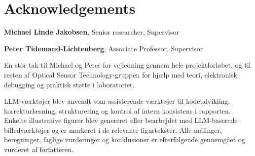 \section*{Acknowledgements}

\textbf{Michael Linde Jakobsen}, Senior researcher, Supervisor \newline

\textbf{Peter Tidemand-Lichtenberg}, Associate Professor, Supervisor \newline


En stor tak til Michael og Peter for vejledning gennem hele projektforløbet, og til resten af Optical Sensor Technology-gruppen for hjælp med teori, elektronisk debugging og praktisk støtte i laboratoriet.

LLM-værktøjer blev anvendt som assisterende værktøjer til kodeudvikling, korrekturlæsning, strukturering og kontrol af intern konsistens i rapporten. Enkelte illustrative figurer blev genereret eller bearbejdet med LLM-baserede billedværktøjer og er markeret i de relevante figurtekster. Alle målinger, beregninger, faglige vurderinger og konklusioner er efterfølgende gennemgået og vurderet af forfatteren.